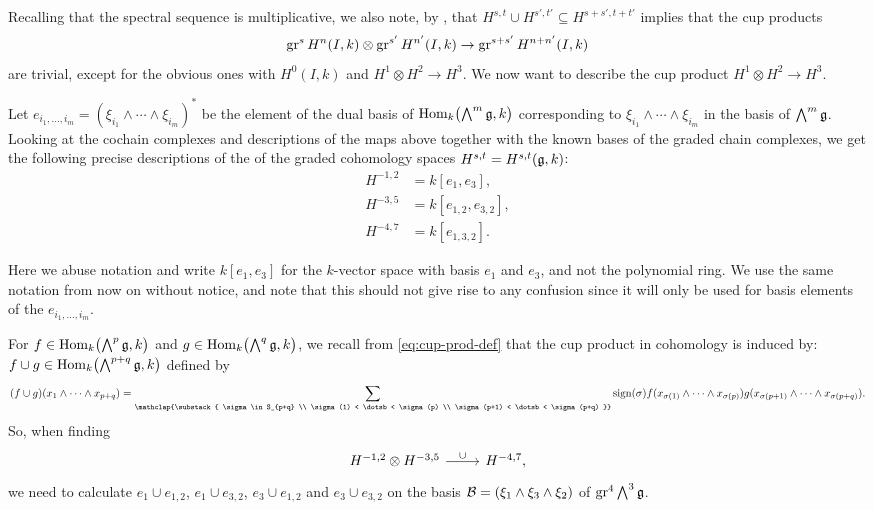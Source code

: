 Recalling that the spectral sequence is multiplicative, we also note, by , that $H^{s,t} \cup H^{s',t'} \subseteq H^{s+s',t+t'}$ implies that the cup products
\begin{equation*}
  \operatorname{gr}^{s} H^{n}(I,k) \otimes \operatorname{gr}^{s'} H^{n'}(I,k) \to \operatorname{gr}^{s+s'} H^{n+n'}(I,k)
\end{equation*}
are trivial, except for the obvious ones with $H^{0}(I,k)$ and $H^{1} \otimes H^{2} \to H^{3}$. We now want to describe the cup product $H^{1} \otimes H^{2} \to H^{3}$.

Let $e_{i_{1},\dotsc,i_{m}} = (\xi_{i_{1}} \wedge \dotsb \wedge \xi_{i_{m}})^{*}$ be the element of the dual basis of $\operatorname{Hom}_{k}\bigl( \bigwedge^{m}\mathfrak{g},k \bigr)$ corresponding to $\xi_{i_{1}} \wedge \dotsb \wedge \xi_{i_{m}}$ in the basis of $\bigwedge^{m}\mathfrak{g}$. Looking at the cochain complexes and descriptions of the maps above together with the known bases of the graded chain complexes, we get the following precise descriptions of the of the graded cohomology spaces $H^{s,t} = H^{s,t}(\mathfrak{g},k)$:
\begin{equation}\label{eq:Hst-spaces-SL2}
  \begin{aligned}
    H^{-1,2} &= k[e_{1},e_{3}], \\
    H^{-3,5} &= k[e_{1,2},e_{3,2}], \\
    H^{-4,7} &= k[e_{1,3,2}].
  \end{aligned}
\end{equation}

\begin{remark}
  Here we abuse notation and write $k[e_{1},e_{3}]$ for the $k$-vector space with basis $e_{1}$ and $e_{3}$, and not the polynomial ring. We use the same notation from now on without notice, and note that this should not give rise to any confusion since it will only be used for basis elements of the $e_{i_{1},\dotsc,i_{m}}$.
\end{remark}

For $f \in \operatorname{Hom}_{k}\bigl( \bigwedge^{p}\mathfrak{g}, k \bigr)$ and $g \in \operatorname{Hom}_{k}\bigl( \bigwedge^{q}\mathfrak{g}, k \bigr)$, we recall from \eqref{eq:cup-prod-def} that the cup product in cohomology is induced by: $f \cup g \in \operatorname{Hom}_{k}\bigl( \bigwedge^{p+q}\mathfrak{g}, k \bigr)$ defined by
\begin{equation*}
  (f \cup g)(x_{1} \wedge \dotsb \wedge x_{p+q})  = \sum_{\mathclap{\substack{ \sigma \in S_{p+q} \\ \sigma(1) < \dotsb < \sigma(p) \\ \sigma(p+1) < \dotsb < \sigma(p+q) }}} \sign(\sigma) f(x_{\sigma(1)} \wedge \dotsb \wedge x_{\sigma(p)}) g(x_{\sigma(p+1)} \wedge \dotsb \wedge x_{\sigma(p+q)}).
\end{equation*}
So, when finding
\[
  \begin{tikzcd}
    H^{-1,2} \otimes H^{-3,5} \ar[r,"\cup"] & H^{-4,7},
  \end{tikzcd}
\]
we need to calculate $e_{1} \cup e_{1,2}$, $e_{1} \cup e_{3,2}$, $e_{3} \cup e_{1,2}$ and $e_{3} \cup e_{3,2}$ on the basis $\mathcal{B} = (\xi_{1} \wedge \xi_{3} \wedge \xi_{2})$ of $\operatorname{gr}^{4} \bigwedge^{3} \mathfrak{g}$.


